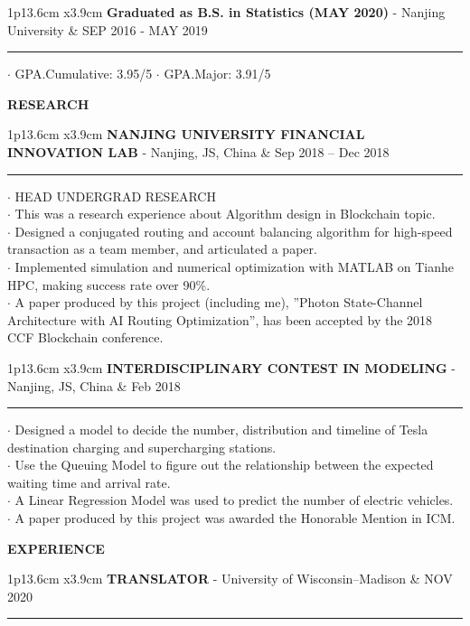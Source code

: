 \documentclass[11pt,A4]{article}
\newcommand{\cvsection}[1]
{
	\begin{center}
		\large\textcolor{sectcol}{\textbf{#1}}
	\end{center}
}
\newcommand{\cvevent}[3]
{

\begin{tabular*}{1\textwidth}{p{13.6cm}  x{3.9cm}}
	\textbf{#2} - \textcolor{bgcol}{#3} &   \vspace{2.5pt}\textcolor{sectcol}{#1}
\end{tabular*}

\vspace{-8pt}
\textcolor{softcol}{\hrule}
\vspace{6pt}


}
\begin{document}
\cvevent{SEP 2016 - MAY 2019}
        {Graduated as B.S. in Statistics (MAY 2020)}
        {Nanjing University}

        $\cdot$ GPA.Cumulative: 3.95/5
        $\cdot$ GPA.Major: 3.91/5\\


\cvsection{RESEARCH}

\cvevent{Sep 2018 – Dec 2018}
        {NANJING UNIVERSITY FINANCIAL INNOVATION LAB}
        {Nanjing, JS, China}

        $\cdot$ HEAD UNDERGRAD RESEARCH\\
        $\cdot$ This was a research experience about Algorithm design in Blockchain topic.\\
        $\cdot$ Designed a conjugated routing and account balancing algorithm for
                high-speed transaction as a team member, and articulated a paper.\\
        $\cdot$ Implemented simulation and numerical optimization with MATLAB on Tianhe HPC, 
                making success rate over 90\%.\\
        $\cdot$ A paper produced by this project (including me), 
                ”Photon State-Channel Architecture with AI Routing Optimization”, 
                has been accepted by the 2018 CCF Blockchain conference.\\

\cvevent{Feb 2018}
        {INTERDISCIPLINARY CONTEST IN MODELING}
        {Nanjing, JS, China}

        $\cdot$ Designed a model to decide the number,
                distribution and timeline of Tesla destination charging 
                and supercharging stations.\\
        $\cdot$ Use the Queuing Model to figure out the relationship between 
                the expected waiting time and arrival rate.\\
        $\cdot$ A Linear Regression Model was used to predict the number of electric vehicles.\\
        $\cdot$ A paper produced by this project was awarded the Honorable Mention in ICM.\\



\cvsection{EXPERIENCE}
\cvevent{NOV 2020}
        {TRANSLATOR}
        {University of Wisconsin–Madison}
\end{document}
